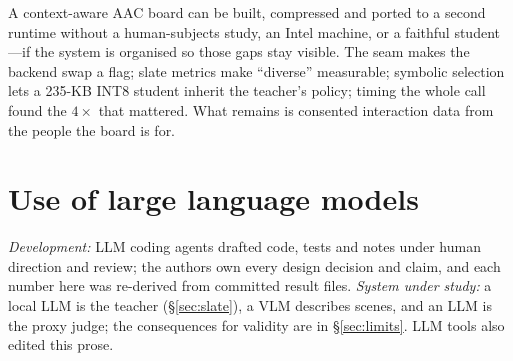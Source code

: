 \documentclass{article}
\begin{document}
A context-aware AAC board can be built, compressed and ported to a second
runtime without a human-subjects study, an Intel machine, or a faithful
student---if the system is organised so those gaps stay visible. The seam makes
the backend swap a flag; slate metrics make ``diverse'' measurable; symbolic
selection lets a 235-KB INT8 student inherit the teacher's policy; timing the
whole call found the $4\times$ that mattered. What remains is consented
interaction data from the people the board is for.

\section*{Use of large language models}

\emph{Development:} LLM coding agents drafted code, tests and notes under human
direction and review; the authors own every design decision and claim, and each
number here was re-derived from committed result files. \emph{System under
study:} a local LLM is the teacher (\S\ref{sec:slate}), a VLM describes scenes,
and an LLM is the proxy judge; the consequences for validity are in
\S\ref{sec:limits}. LLM tools also edited this prose.
\end{document}
